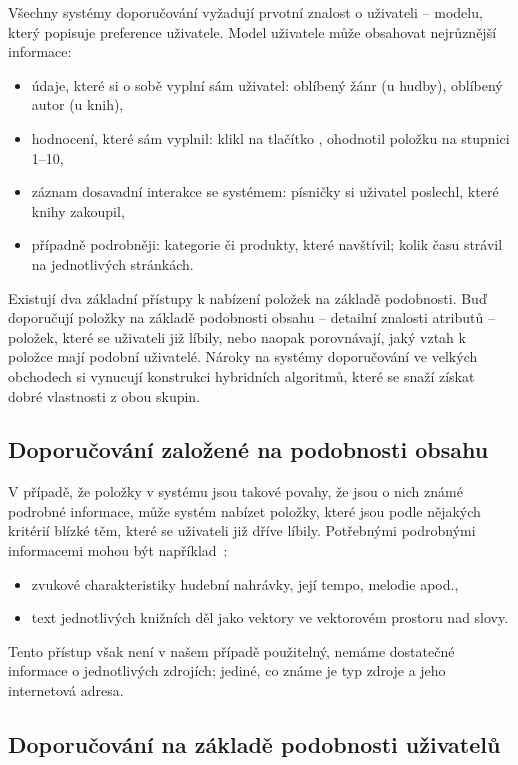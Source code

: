 Všechny systémy doporučování vyžadují prvotní znalost o uživateli -- modelu, který popisuje preference uživatele.
Model uživatele může obsahovat nejrůznější informace:
\begin{itemize}
    \item údaje, které si o sobě vyplní sám uživatel: oblíbený žánr (u hudby), oblíbený autor (u knih),
    \item hodnocení, které sám vyplnil: klikl na tlačítko , ohodnotil položku na stupnici 1--10,
    \item záznam dosavadní interakce se systémem: písničky si uživatel poslechl, které knihy zakoupil,
	\item případně podrobněji: kategorie či produkty, které navštívil; kolik času strávil na jednotlivých stránkách.
\end{itemize}

Existují dva základní přístupy k nabízení položek na základě podobnosti.
Buď doporučují položky na základě podobnosti obsahu -- detailní znalosti atributů -- položek, které se uživateli již líbily,
nebo naopak porovnávají, jaký vztah k položce mají podobní uživatelé.
Nároky na systémy doporučování ve velkých obchodech si vynucují konstrukci hybridních algoritmů, které se snaží získat dobré vlastnosti z obou skupin.

\subsection{Doporučování založené na podobnosti obsahu}

V případě, že položky v systému jsou takové povahy, že jsou o nich známé podrobné informace, může systém nabízet položky, které jsou podle nějakých kritérií blízké těm, které se uživateli již dříve líbily.
Potřebnými podrobnými informacemi mohou být například~\cite{pazzani2007content}:
\begin{itemize}
    \item zvukové charakteristiky hudební nahrávky, její tempo, melodie apod.,
    \item text jednotlivých knižních děl jako vektory ve vektorovém prostoru nad slovy.
\end{itemize}

Tento přístup však není v našem případě použitelný, nemáme dostatečné informace o jednotlivých zdrojích; jediné, co známe je typ zdroje a jeho internetová adresa.

\subsection{Doporučování na základě podobnosti uživatelů}

